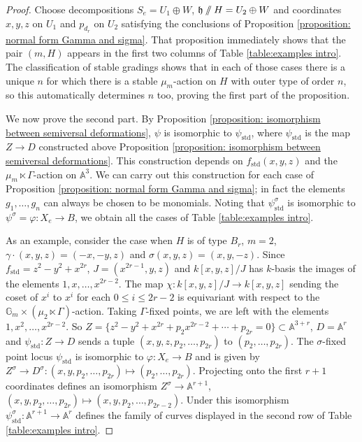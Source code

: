 \documentclass{article} %
\numberwithin{equation}{section}
\theoremstyle{definition}
\newcommand{\G}{\mathbb{G}}
\newcommand{\A}{\mathbb{A}}
\newcommand{\GIT}{\mathbin{/\mkern-6mu/}}
\newcommand{\frakh}{\mathfrak h}
\newcommand{\rl}{r} %
\begin{document}
\begin{proof} 
Choose decompositions $S_e = U_1\oplus W$, $\frakh\GIT H = U_2\oplus W$ and coordinates $x,y,z$ on $U_1$ and $p_{d_r}$ on $U_2$ satisfying the conclusions of Proposition \ref{proposition: normal form Gamma and sigma}.
That proposition immediately shows that the pair $(m,H)$ appears in the first two columns of Table \ref{table:examples intro}.
The classification of stable gradings \cite[Section 7]{GrossLevyReederYu-GradingsPosRank} shows that in each of those cases there is a unique $n$ for which there is a stable $\mu_m$-action on $H$ with outer type of order $n$, so this automatically determines $n$ too, proving the first part of the proposition.

We now prove the second part.
By Proposition \ref{proposition: isomorphism between semiversal deformations}, $\psi$ is isomorphic to $\psi_{\mathrm{std}}$, where $\psi_{\mathrm{std}}$ is the map $Z\rightarrow D$ constructed above Proposition \ref{proposition: isomorphism between semiversal deformations}.
This construction depends on $f_{\mathrm{std}}(x,y,z)$ and the $\mu_m\ltimes \Gamma$-action on $\A^3$.
We can carry out this construction for each case of Proposition \ref{proposition: normal form Gamma and sigma}; in fact the elements $g_1, \dots, g_n$ can always be chosen to be monomials.
Noting that $\psi_{\mathrm{std}}^{\sigma}$ is isomorphic to $\psi^{\sigma} = \varphi\colon X_e\rightarrow B$, we obtain all the cases of Table \ref{table:examples intro}.

As an example, consider the case when $H$ is of type $B_{\rl}$, $m=2$, $\gamma\cdot (x,y,z) = (-x,-y,z)$ and $\sigma(x,y,z) = (x,y,-z)$.
Since $f_{\mathrm{std}} = z^2-y^2 + x^{2r}$, $J = (x^{2r-1},y,z)$ and $k[x,y,z]/J$ has $k$-basis the images of the elements $1,x,\dots, x^{2r-2}$.
The map $\chi\colon k[x,y,z]/J\rightarrow k[x,y,z]$ sending the coset of $x^i$ to $x^i$ for each $0\leq i \leq 2r-2$ is equivariant with respect to the $\G_m\times (\mu_2\ltimes \Gamma)$-action.
Taking $\Gamma$-fixed points, we are left with the elements $1,x^2, \dots, x^{2r-2}$.
So $Z = \{z^2-y^2+ x^{2r} + p_2 x^{2r-2} + \cdots + p_{2r} = 0\}\subset \A^{3+r}$, $D = \A^r$ and $\psi_{\mathrm{std}}\colon Z\rightarrow D$ sends a tuple $(x,y,z,p_2, \dots, p_{2r})$ to $(p_2, \dots, p_{2r})$.
The $\sigma$-fixed point locus $\psi_{\mathrm{std}}$ is isomorphic to $\varphi\colon X_e\rightarrow B$ and is given by $Z^{\sigma}\rightarrow D^{\sigma}\colon (x,y,p_2, \dots, p_{2r})\mapsto (p_2, \dots, p_{2r})$.
Projecting onto the first $r+1$ coordinates defines an isomorphism $Z^{\sigma} \rightarrow \A^{r+1}$, $(x,y,p_2, \dots, p_{2r})\mapsto (x,y,p_2, \dots, p_{2r-2})$.
Under this isomorphism $\psi^{\sigma}_{\mathrm{std}}\colon \A^{r+1} \rightarrow \A^r$ defines the family of curves displayed in the second row of Table \ref{table:examples intro}.


\end{proof}
\end{document}
